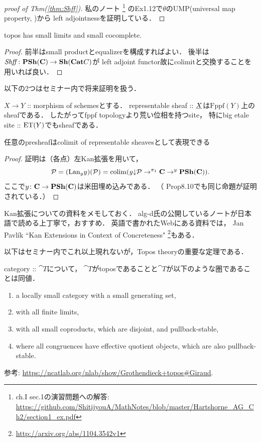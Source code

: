 \documentclass[a4paper, dvipdfmx]{jsarticle}
\begin{document}
\begin{proof}[proof of Thm(\ref{thm:Shff})]
    私のノート
    \footnote{\cite{HarAG} ch.I sec.1の演習問題への解答: 
        \url{https://github.com/ShitijyouA/MathNotes/blob/master/Hartshorne_AG_Ch2/section1_ex.pdf}}
    のEx1.12で$\theta$のUMP(universal map property, \cite{Awodey})から
    left adjointnessを証明している．
\end{proof}

\begin{Prop}
    topos has small limits and small cocomplete.
\end{Prop}
\begin{proof}
    前半はsmall productとequalizerを構成すればよい．
    後半は$\mathit{Shff} \colon \mathbf{PSh}(\mathbf{C}) \to \mathbf{Sh}(\mathbf{Cat}{C})$が
    left adjoint functor故にcolimitと交換することを用いれば良い．
\end{proof}

以下の$2$つはセミナー内で将来証明を扱う．
\begin{Thm}
    $X \to Y$ :: morphism of schemesとする．
    representable sheaf :: $\underline{X}$は$\mathrm{Fppf}(Y)$上のsheafである．
    したがってfppf topologyより荒い位相を持つsite，
    特にbig etale site :: $\mathrm{ET}(Y)$でもsheafである．
\end{Thm}

\begin{Prop}
    任意のpresheafはcolimit of representable sheavesとして表現できる
\end{Prop}
\begin{proof}
    証明は（各点）左Kan拡張を用いて，
    \[ \mathcal{P}=(\mathrm{Lan}_{y}y)(\mathcal{P})=\operatorname{colim}(y{\downarrow}\mathcal{P} \to^{\pi_1} \mathbf{C} \to^{y} \mathbf{PSh}(\mathbf{C})). \]
    ここで$y \colon \mathbf{C} \to \mathbf{PSh}(\mathbf{C})$は米田埋め込みである．
    （\cite{Awodey} Prop8.10でも同じ命題が証明されている．）
\end{proof}

\begin{Remark}
    Kan拡張についての資料をメモしておく．
    alg-d氏の公開しているノートが日本語で読める上丁寧で，おすすめ．
    英語で書かれたWebにある資料では，
    Jan Pavl\'ik ``Kan Extensions in Context of Concreteness"
    \footnote{ \url{http://arxiv.org/abs/1104.3542v1} }もある．
\end{Remark}

以下はセミナー内でこれ以上現れないが，Topos theoryの重要な定理である．
\begin{Thm}
    category :: $\cat{T}$について，
    $\cat{T}$がtoposであることと$\cat{T}$が以下のような圏であることは同値．
    \begin{enumerate}[label=(G\arabic*)]
        \item a locally small category with a small generating set,
        \item with all finite limits,
        \item with all small coproducts, which are disjoint, and pullback-stable,
        \item where all congruences have effective quotient objects, which are also pullback-stable.
    \end{enumerate}
    参考: \url{https://ncatlab.org/nlab/show/Grothendieck+topos#Giraud}.
\end{Thm}
\end{document}
